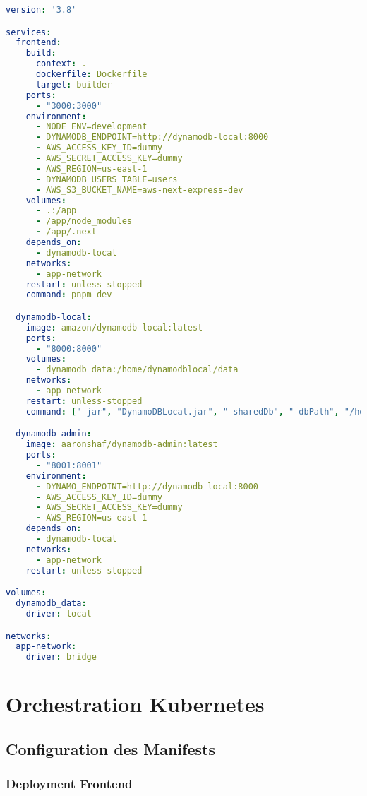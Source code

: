 \begin{lstlisting}[language=YAML, caption=docker-compose.yml]
version: '3.8'

services:
  frontend:
    build:
      context: .
      dockerfile: Dockerfile
      target: builder
    ports:
      - "3000:3000"
    environment:
      - NODE_ENV=development
      - DYNAMODB_ENDPOINT=http://dynamodb-local:8000
      - AWS_ACCESS_KEY_ID=dummy
      - AWS_SECRET_ACCESS_KEY=dummy
      - AWS_REGION=us-east-1
      - DYNAMODB_USERS_TABLE=users
      - AWS_S3_BUCKET_NAME=aws-next-express-dev
    volumes:
      - .:/app
      - /app/node_modules
      - /app/.next
    depends_on:
      - dynamodb-local
    networks:
      - app-network
    restart: unless-stopped
    command: pnpm dev

  dynamodb-local:
    image: amazon/dynamodb-local:latest
    ports:
      - "8000:8000"
    volumes:
      - dynamodb_data:/home/dynamodblocal/data
    networks:
      - app-network
    restart: unless-stopped
    command: ["-jar", "DynamoDBLocal.jar", "-sharedDb", "-dbPath", "/home/dynamodblocal/data"]

  dynamodb-admin:
    image: aaronshaf/dynamodb-admin:latest
    ports:
      - "8001:8001"
    environment:
      - DYNAMO_ENDPOINT=http://dynamodb-local:8000
      - AWS_ACCESS_KEY_ID=dummy
      - AWS_SECRET_ACCESS_KEY=dummy
      - AWS_REGION=us-east-1
    depends_on:
      - dynamodb-local
    networks:
      - app-network
    restart: unless-stopped

volumes:
  dynamodb_data:
    driver: local

networks:
  app-network:
    driver: bridge
\end{lstlisting}

\section{Orchestration Kubernetes}

\subsection{Configuration des Manifests}

\subsubsection{Deployment Frontend}

